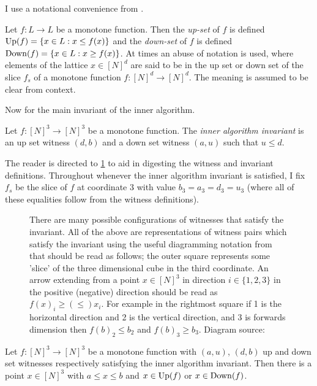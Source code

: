 I use a notational convenience from \citep{fasterTarski}.
\begin{definition}
  Let $f : L \to L$ be a monotone function. Then the \emph{up-set} of $f$ is defined $\mathrm{Up}(f) = \{x \in L : x \leq f(x)\}$
  and the \emph{down-set} of $f$ is defined $\mathrm{Down}(f) = \{x \in L : x \geq f(x)\}$. At times an abuse of notation is used,
  where elements of the lattice $x \in [N]^d$ are said to be in the up set or down
  set of the slice $f_s$ of a monotone function $f : [N]^d \to [N]^d$. The meaning
  is assumed to be clear from context.
\end{definition}
Now for the main invariant of the inner algorithm.
\begin{definition}
  Let $f : [N]^3 \to [N]^3$ be a monotone function. The \emph{inner algorithm invariant}
  is an up set witness $(d, b)$ and a down set witness $(a, u)$ such that $u \leq d$.
\end{definition}
The reader is directed to \cref{witnessFig} to aid in digesting the witness and invariant
definitions. Throughout whenever the inner algorithm invariant is satisfied,  
I fix $f_s$ be the slice of $f$ at coordinate $3$ with value $b_3 = a_3 = d_3 = u_3$ (where all of
these equalities follow from the witness definitions).
\vspace{-10pt}
\begin{figure}[ht] 
  \centering
  \scalebox{0.4}{}
  \caption{There are many possible configurations of witnesses that satisfy the invariant.
  All of the above are representations of witness pairs which satisfy the invariant using the useful diagramming
  notation from \citep{fasterTarski} that should be read as follows; the outer square
  represents some 'slice' of the three dimensional cube in the third coordinate. An arrow
  extending from a point $x \in [N]^3$ in direction $i \in \{1, 2, 3\}$ in the positive (negative) direction
  should be read as $f(x)_i \geq (\leq) x_i$. For example in the rightmost square if 1 is the horizontal
  direction and 2 is the vertical direction, and 3 is forwards dimension then $f(b)_2 \leq b_2$ and $f(b)_3 \geq b_3$. 
  Diagram source: \citep{fasterTarski}} \label{witnessFig}
\end{figure}
\vspace{-10pt}
\begin{lemma}
  Let $f : [N]^3 \to [N]^3$ be a monotone function with $(a, u)$, $(d, b)$ up
  and down set witnesses respectively satisfying the inner algorithm invariant.
  Then there is a point $x \in [N]^3$ with $a \leq x \leq b$ and $x \in \mathrm{Up}(f)$ or $x \in \mathrm{Down}(f)$.
\end{lemma}

